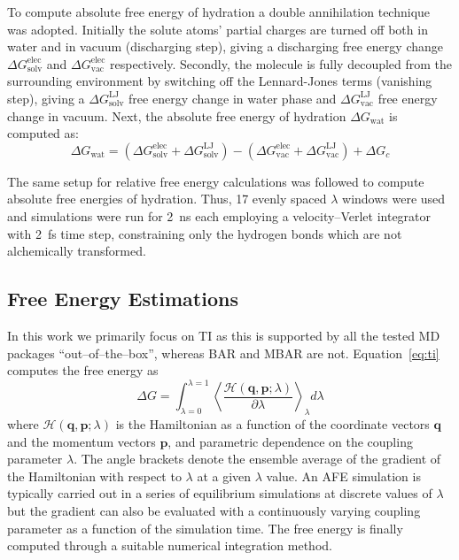 \documentclass[journal=jctcce,manuscript=article]{achemso}
\renewcommand{\vec}[1]{\mathbf{#1}}
\begin{document}
To compute absolute free energy of hydration a double annihilation
technique~\cite{jorgensen1988efficient,GILSON19971047,Bosisio2016}
was adopted.
Initially the solute atoms' partial charges are turned off both in water and in
vacuum (discharging step), giving a discharging
free energy change $\Delta G_\mathrm{solv}^\mathrm{elec}$ and $\Delta
G_\mathrm{vac}^\mathrm{elec}$ respectively. Secondly,
the molecule is fully decoupled from the surrounding environment by switching
off the Lennard-Jones terms (vanishing step), giving a $\Delta
G_\mathrm{solv}^\mathrm{LJ}$ free energy change in water phase and $\Delta
G_\mathrm{vac}^\mathrm{LJ}$ free energy change in vacuum.
Next, the absolute free energy of hydration $\Delta G_\mathrm{wat}$ is computed as:
\begin{equation}
\label{eq:absolutehyd}
\Delta G_\mathrm{wat} = (\Delta G_\mathrm{solv}^\mathrm{elec} + \Delta
G_\mathrm{solv}^\mathrm{LJ}) - (\Delta G_\mathrm{vac}^\mathrm{elec} + \Delta
G_\mathrm{vac}^\mathrm{LJ}) + \Delta G_c
\end{equation}

The same setup for relative free energy calculations was followed to
compute absolute free energies of hydration.  Thus, 17 evenly spaced $\lambda$ windows were used and simulations were run for \SI{2}{ns} each employing a velocity--Verlet integrator with \SI{2}{fs} time step, constraining only the hydrogen bonds which are not alchemically transformed.
\fi

\subsection{Free Energy Estimations}
\label{sec:analysis}

In this work we primarily focus on TI as this is supported by all the tested MD packages ``out--of--the--box'', whereas BAR and MBAR are not.
Equation~\ref{eq:ti} computes the free energy as
\begin{equation}\label{eq:ti}
	\Delta G = \int_{\lambda=0}^{\lambda=1}
	\left\langle
	\frac{\mathscr{H}(\vec{q},\vec{p};\lambda)}{\partial\lambda}\right\rangle_\lambda
	 d\lambda
\end{equation}
where $\mathscr{H}(\vec{q},\vec{p};\lambda)$ is the Hamiltonian as a function
of the coordinate vectors $\vec{q}$ and the momentum vectors $\vec{p}$, and
parametric dependence on the coupling parameter $\lambda$.  The angle brackets
denote the ensemble average of the gradient of the Hamiltonian with respect to
$\lambda$ at a given $\lambda$ value.  An AFE simulation is typically carried
out in a series of equilibrium simulations at discrete values of $\lambda$ but
the gradient can also be evaluated with a continuously varying coupling
parameter as a function of the simulation time.  The free energy is finally
computed through a suitable numerical integration method.
\end{document}
